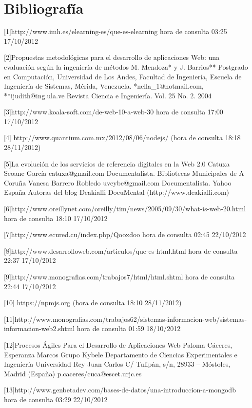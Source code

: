 \section{Bibliografía}


[1]http://www.imh.es/elearning-es/que-es-elearning hora de consulta 03:25 17/10/2012

[2]Propuestas metodológicas para el desarrollo de aplicaciones Web: una evaluación según la ingeniería de métodos
   M. Mendoza* y J. Barrios**
   Postgrado en Computación,
   Universidad de Los Andes, Facultad de Ingeniería,
   Escuela de Ingeniería de Sistemas,
   Mérida, Venezuela.
   *nella\_1@hotmail.com,
   **ijudith@ing.ula.ve
   Revista Ciencia e Ingeniería. Vol. 25 No. 2. 2004 

[3]http://www.koala-soft.com/de-web-10-a-web-30 hora de consulta 17:00 17/10/2012

[4] http://www.quantium.com.mx/2012/08/06/nodejs/ (hora de consulta 18:18 28/11/2012)

[5]La evolución de los servicios de referencia digitales en la Web 2.0
   Catuxa Seoane García
   catuxa@gmail.com
   Documentalista. Bibliotecas Municipales de A Coruña
   Vanesa Barrero Robledo
   uveybe@gmail.com
   Documentalista. Yahoo España
   Autoras del blog Deakialli DocuMental (http://www.deakialli.com)

[6]http://www.oreillynet.com/oreilly/tim/news/2005/09/30/what-is-web-20.html  hora de consulta 18:10 17/10/2012

[7]http://www.ecured.cu/index.php/Qooxdoo hora de consulta 02:45 22/10/2012

[8]http://www.desarrolloweb.com/articulos/que-es-html.html hora de consulta 22:37 17/10/2012

[9]http://www.monografias.com/trabajos7/html/html.shtml hora de consulta 22:44 17/10/2012

[10] https://npmjs.org (hora de consulta 18:10 28/11/2012)

[11]http://www.monografias.com/trabajos62/sistemas-informacion-web/sistemas-informacion-web2.shtml hora de consulta 01:59 18/10/2012

[12]Procesos Ágiles Para el Desarrollo de Aplicaciones Web 
    Paloma Cáceres, Esperanza Marcos
    Grupo Kybele
    Departamento de Ciencias Experimentales e Ingeniería
    Universidad Rey Juan Carlos
    C/ Tulipán, s/n, 28933 – Móstoles, Madrid (España)
    {p.caceres/cuca}@escet.urjc.es

[13]http://www.genbetadev.com/bases-de-datos/una-introduccion-a-mongodb hora de consulta 03:29 22/10/2012

